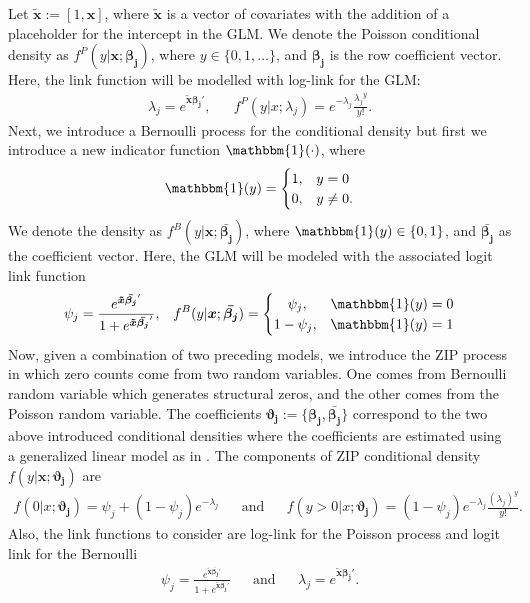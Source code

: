 \documentclass[11pt,letterpaper]{article}
\numberwithin{equation}{section}
\numberwithin{equation}{section}
\numberwithin{equation}{section}
\begin{document}
\newcommand{\xTilda}{\bm{\tilde{x}}}
Let $ \xTilda := [1,\bm{x}]$, where $\xTilda $ is a vector of covariates with the addition of a placeholder for the intercept in the GLM. We denote the Poisson conditional density  as $ f^P(y|\bm{x}; \bm{\beta_j}) $, where $y \in \{0,1,\dots\}$, and  $\bm{\beta_j}$ is the row coefficient vector. 
Here, the link function will be modelled with log-link for the GLM:
 \begin{align*}
\lambda_j = e^{\xTilda \bm{\beta_j}'}, && %
f^P(y|  x ; \lambda_{j} ) = e^{-\lambda_j} \frac{{\lambda_j}^y}{y!}.
 \end{align*}
Next, we introduce a Bernoulli process for the conditional density but first we introduce a new indicator function $\mathbbm{1}(\cdot) $, where 
	\begin{align*}
	\mathbbm{1}(y) = \begin{cases}
	 1, & y = 0\\
	 0, & y \neq 0. 
	\end{cases}
	\end{align*} We denote the density as  $ f^{B}(y|\bm{x}; \bm{\bar{\beta_j}}) $, where $\mathbbm{1}(y) \in \{0,1 \} $, and  $\bm{\bar{\beta_j}}$ as the coefficient vector.  Here, the GLM will be modeled with the associated logit link function
 \begin{align*}
 \psi_j =  \frac{e^{\xTilda \bm{\bar{\beta_j}}'}}{1+ e^{\xTilda  \bm{\bar{\beta_j}}'}},  &&
 f^B(y | \bm{x} ; \bm{\bar{\beta_j}}) = \begin{cases} 
      \quad \psi_j, & \mathbbm{1}(y) = 0 \\
     1 -  \psi_j,  & \mathbbm{1}(y) = 1
   \end{cases}
 \end{align*}
 Now, given a combination of two preceding models, we introduce the ZIP process in which zero counts come from two random variables. One comes from Bernoulli random variable which generates structural zeros, and the other comes from the Poisson random variable. The coefficients $ \bm{\vartheta_{j}} :=  \{ \bm{\beta_{j}},  \bm{\bar{\beta_j}} \} $ correspond to the two above introduced conditional densities where the coefficients are estimated using a generalized linear model as in \cite{Lambert}. The components of ZIP conditional density $f(y|\bm{x}; \bm{\vartheta_{j}}  )$ are %
 \begin{align*}
 f(0 | x ; \bm{ \vartheta_{j} } ) = \psi_j + (1 - \psi_j)e^{-\lambda_j}  & &  \text{and}  & &
f(y > 0 |  x ; \bm{ \vartheta_{j} } ) = (1 - \psi_j)e^{-\lambda_j} \frac{\left(\lambda_j \right)^y  }{y!}.  
 \end{align*}
Also, the link functions to consider are log-link for the Poisson process and logit link for the Bernoulli
 \begin{align*}
 \psi_j =  \frac{e^{\xTilda \bm{\bar{\beta_j}}'}}{1+ e^{\xTilda \bm{\bar{\beta_j}}'}}  & & \text{and} & &
\lambda_j  = e^{\xTilda \bm{\beta_j}'}.
 \end{align*}
\end{document}

